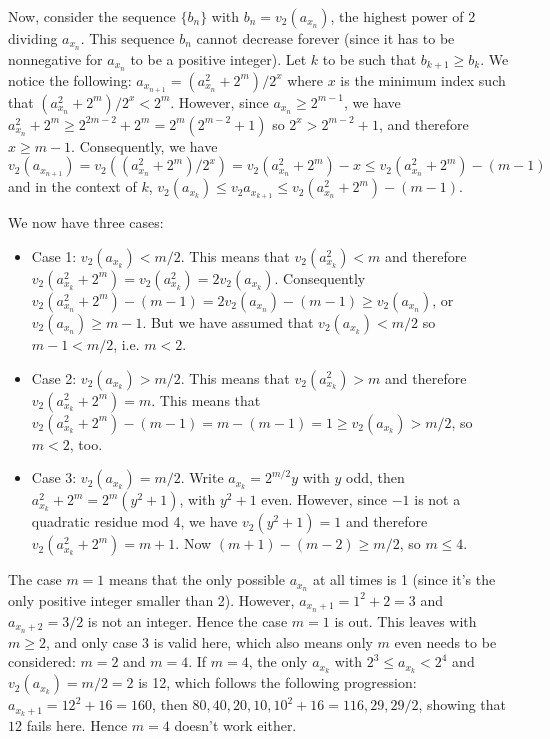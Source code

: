 \documentclass[11pt,a4paper]{article}
\begin{document}
\begin{enumerate}
	Now, consider the sequence $\{b_n\}$ with $b_n=v_2(a_{x_n})$, the highest power of 2 dividing $a_{x_n}$. This sequence $b_n$ cannot decrease forever (since it has to be nonnegative for $a_{x_n}$ to be a positive integer). Let $k$ to be such that $b_{k+1}\ge b_k$. We notice the following: $a_{x_{n+1}}=(a_{x_n}^2+2^m)/2^x$ where $x$ is the minimum index such that 
	$(a_{x_n}^2+2^m)/2^x<2^m$. 
	However, since $a_{x_n}\ge 2^{m-1}$, we have $a_{x_n}^2+2^m\ge 2^{2m-2}+2^m=2^m(2^{m-2}+1)$ so $2^x>2^{m-2}+1$, and therefore $x\ge m-1$. 
	Consequently, we have 
	\[v_2(a_{x_{n+1}})=v_2((a_{x_n}^2+2^m)/2^x)=v_2(a_{x_n}^2+2^m)-x\le v_2(a_{x_n}^2+2^m) -(m-1)
	\]
	and in the context of $k$, $v_2(a_{x_k})\le v_2{a_{x_{k+1}}}\le v_2(a_{x_n}^2+2^m) -(m-1)$. 
	
	We now have three cases:
	\begin{itemize}
		\item Case 1: $v_2(a_{x_k})<m/2$. This means that $v_2(a_{x_k}^2)<m$ and therefore $v_2(a_{x_k}^2+2^m)=v_2(a_{x_k}^2)=2v_2(a_{x_k})$. 
		Consequently $v_2(a_{x_n}^2+2^m) -(m-1) = 2v_2(a_{x_n})-(m-1)\ge v_2(a_{x_n})$, or $v_2(a_{x_n})\ge m-1$. But we have assumed that $v_2(a_{x_k})<m/2$ so $m-1 < m/2$, i.e. $m<2$. 
		
		\item Case 2: $v_2(a_{x_k})>m/2$. This means that $v_2(a_{x_k}^2)>m$ and therefore $v_2(a_{x_k}^2+2^m)=m$. This means that $v_2(a_{x_k}^2+2^m) -(m-1)=m-(m-1)=1\ge v_2(a_{x_k})>m/2$, so $m<2$, too. 
		
		\item Case 3: $v_2(a_{x_k})=m/2$. Write $a_{x_k}=2^{m/2}y$ with $y$ odd, then $a_{x_k}^2+2^m=2^m(y^2+1)$, with $y^2+1$ even. However, since $-1$ is not a quadratic residue mod 4, we have $v_2(y^2+1)=1$ and therefore $v_2(a_{x_k}^2+2^m)=m+1$. Now $(m+1)-(m-2)\ge m/2$, so $m\le 4$. 
	\end{itemize}
	The case $m=1$ means that the only possible $a_{x_n}$ at all times is 1 (since it's the only positive integer smaller than 2). However, $a_{x_n+1}=1^2+2=3$ and $a_{x_n+2}=3/2$ is not an integer. Hence the case $m=1$ is out. This leaves with $m\ge 2$, and only case 3 is valid here, which also means only $m$ even needs to be considered: $m=2$ and $m=4$. 
	If $m=4$, the only $a_{x_k}$ with $2^3\le a_{x_k}<2^4$ and $v_2(a_{x_k})=m/2=2$ is 12, which follows the following progression: $a_{x_k+1}=12^2+16=160$, then $80, 40, 20, 10, 10^2+16=116, 29, 29/2$, showing that $12$ fails here. Hence $m=4$ doesn't work either. 
	

\end{enumerate}
\end{document}
